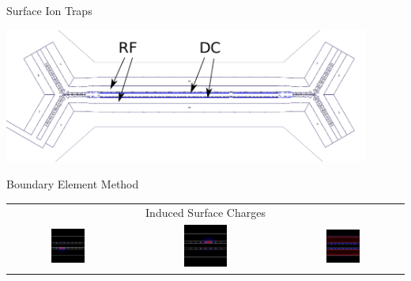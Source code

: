 \documentclass{beamer}
\begin{document}
\begin{frame}{Surface Ion Traps}
	\centerline{\includegraphics[width=0.9\textwidth]{HOA}}
\end{frame}

\begin{frame}{Boundary Element Method}
	\begin{table}\begin{tabular}{ccc}
		\centering
		& Induced Surface Charges & \\
		\includegraphics[width=0.3\textwidth]{dc_5} &
		\includegraphics[width=0.3\textwidth]{dc_10} &
		\includegraphics[width=0.3\textwidth]{rf_rails} \\


\end{tabular}
\end{table}
\end{frame}
\end{document}
